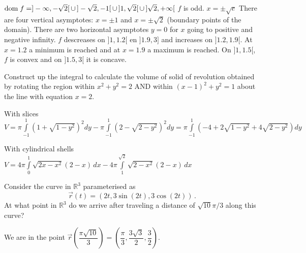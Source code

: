\begin{Answer}

\Question $\text{dom}{\;f} = ]- \infty, - \sqrt{2}[ \, \cup \, ]- \sqrt{2}, -1[\,   \cup \,  ]1, \sqrt{2}[ \,  \cup \,  ]\sqrt{2}, + \infty[$
\Question $f$ is odd.
\Question $x = \pm \sqrt{e}$
\Question There are four vertical asymptotes: $x=\pm 1$ and $x= \pm \sqrt{2}$ (boundary points of the domain). There are two horizontal asymptotes $y=0$ for $x$ going to positive and negative infinity.
\Question $f$ descreases on $]1, 1.2[$ en $]1.9, 3]$ and increases on $]1.2, 1.9[$. At $x=1.2$ a minimum is reached and at $x=1.9$ a maximum is reached. On $]1, 1.5[$, $f$ is convex and on $]1.5, 3[$ it is concave.

\end{Answer}


\begin{Exercise} %
Construct up the integral to calculate the volume of solid of revolution obtained by rotating the region within $x^2+y^2=2$ AND within $(x-1)^2+y^2=1$ about the line with equation $x=2$.
\end{Exercise} 

\begin{Answer}


\Question With slices\\
$V = \pi \displaystyle \int\limits_{-1}^{1} \left(1+\sqrt{1-y^2} \right)^2 dy - \pi \displaystyle \int\limits_{-1}^{1} \left(2-\sqrt{2-y^2} \right)^2 dy = \pi \displaystyle \int\limits_{-1}^{1} \left(-4 + 2\sqrt{1-y^2} +4\sqrt{2-y^2} \right) dy$ 

\Question With cylindrical shells \\
$V = 4 \pi \displaystyle \int\limits_{0}^{1}  \sqrt{2x-x^2} (2-x) \, dx - 4 \pi \displaystyle \int\limits_{1}^{\sqrt{2}}  \sqrt{2-x^2} (2-x) \, dx $


\end{Answer}


\begin{Exercise} %
Consider the curve in $\mathbb{R}^3$ parameterised as
$$\vec{r}(t)=\left( 2t,3\sin \left( {2t} \right),3\cos \left( {2t} \right) \right)\,.$$
At what point in $\mathbb{R}^3$ do we arrive after traveling a distance of $\sqrt{10}\pi/3$ along this curve?
\end{Exercise}

\begin{Answer}\phantom{}
We are in the point $\vec{r} \left(\dfrac{\pi \sqrt{10}}{3} \right) = \left(\dfrac{\pi}{3}, \dfrac{3 \sqrt{3}}{2}, \dfrac{3}{2}\right)$.
\end{Answer}


